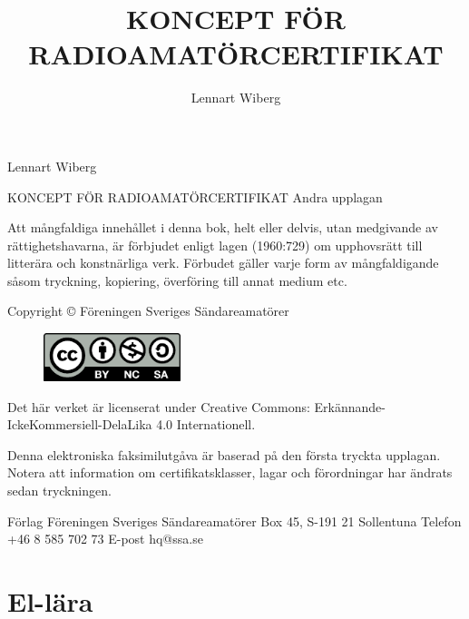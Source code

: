 \documentclass[a4paper,twoside,twocolumn,openright]{book}
\begin{document}
\frontmatter
\title{KONCEPT FÖR RADIOAMATÖRCERTIFIKAT}
\author{Lennart Wiberg}
\maketitle

Lennart Wiberg

KONCEPT FÖR RADIOAMATÖRCERTIFIKAT
Andra upplagan

Att mångfaldiga innehållet i denna bok, helt eller delvis, utan medgivande av
rättighetshavarna, är förbjudet enligt lagen (1960:729) om upphovsrätt till
litterära och konstnärliga verk. Förbudet gäller varje form av mångfaldigande
såsom tryckning, kopiering, överföring till annat medium etc.

Copyright © Föreningen Sveriges Sändareamatörer

\begin{figure}[h]
\includegraphics[width=4cm]{images/cc-by-nc-sa}
\end{figure}
Det här verket är licenserat under Creative Commons: Erkännande-IckeKommersiell-DelaLika 4.0 Internationell.



Denna elektroniska faksimilutgåva är baserad på den första tryckta
upplagan. Notera att information om certifikatsklasser, lagar och
förordningar har ändrats sedan tryckningen.


Förlag
Föreningen Sveriges Sändareamatörer
Box 45, S-191 21 Sollentuna
Telefon +46 8 585 702 73
E-post hq@ssa.se


\tableofcontents

\mainmatter










\chapter{El-lära}


\cleardoublepage

\cleardoublepage

\cleardoublepage

\cleardoublepage

\cleardoublepage

\cleardoublepage

\cleardoublepage

\cleardoublepage

\end{document}
